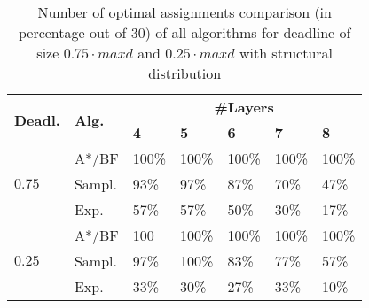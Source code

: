 \documentclass[letterpaper]{article} %
\newcommand{\astar}{\textsc{A*}\xspace}
\begin{document}
\begin{table}[]
\centering
\small
\begin{tabular}{|l|l|l|l|l|l|l|}
\hline
\multirow{2}{*}{\textbf{Deadl.}} & \multirow{2}{*}{\textbf{Alg.}} & \multicolumn{5}{c|}{\textbf{\#Layers}}                         \\ \cline{3-7}
                                   &                                     & \textbf{4} & \textbf{5} & \textbf{6} & \textbf{7} & \textbf{8} \\ \hline
\multirow{3}{*}{$0.75$}  & \astar/BF                                  & 100\%         & 100\%         & 100\%         & 100\%         & 100\%         \\ \cline{2-7}
                                   & Sampl.                            & 93\%         & 97\%         & 87\%         & 70\%         & 47\%         \\ \cline{2-7}
                                   & Exp.                         & 57\%         & 57\%         & 50\%         & 30\%          & 17\%          \\ \hline
\multirow{3}{*}{$0.25$}  & \astar/BF                                  & 100         & 100\%         & 100\%         & 100\%         & 100\%         \\ \cline{2-7}
                                   & Sampl.                            & 97\%         & 100\%         & 83\%         & 77\%         & 57\%         \\ \cline{2-7}
                                   & Exp.                         & 33\%         & 30\%          & 27\%          & 33\%         & 10\%          \\ \hline
\end{tabular}
\caption{Number of optimal assignments comparison (in percentage out of 30) of all algorithms for deadline of size $0.75\cdot maxd$ and $0.25\cdot maxd$ with structural distribution}\label{tableOptAssgn}
\end{table}
\end{document}
